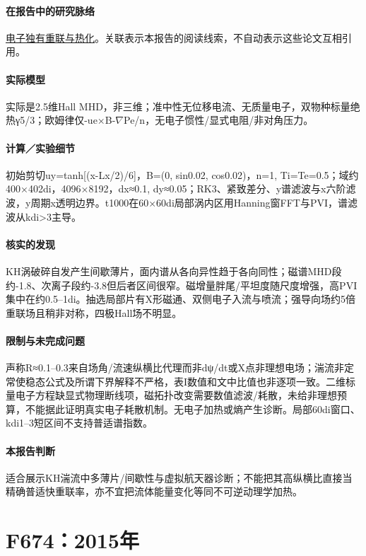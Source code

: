 \paragraph{在报告中的研究脉络}\hyperref[story:energy]{电子独有重联与热化}。关联表示本报告的阅读线索，不自动表示这些论文互相引用。

\paragraph{实际模型}实际是2.5维Hall MHD，非三维；准中性无位移电流、无质量电子，双物种标量绝热γ5/3；欧姆律仅-ue×B-\ensuremath{\nabla}Pe/n，无电子惯性/显式电阻/非对角压力。

\paragraph{计算／实验细节}初始剪切uy=tanh[(x-Lx/2)/6]，B=(0, sin0.02, cos0.02)，n=1, Ti=Te=0.5；域约400×402di，4096×8192，dx≈0.1, dy≈0.05；RK3、紧致差分、y谱滤波与x六阶滤波，y周期x透明边界。t1000在60×60di局部涡内区用Hanning窗FFT与PVI，谱滤波从kdi>3主导。

\paragraph{核实的发现}KH涡破碎自发产生间歇薄片，面内谱从各向异性趋于各向同性；磁谱MHD段约-1.8、次离子段约-3.8但后者区间很窄。磁增量胖尾/平坦度随尺度增强，高PVI集中在约0.5–1di。抽选局部片有X形磁通、双侧电子入流与喷流；强导向场约5倍重联场且稍非对称，四极Hall场不明显。

\paragraph{限制与未完成问题}声称R≈0.1–0.3来自场角/流速纵横比代理而非dψ/dt或X点非理想电场；湍流非定常使稳态公式及所谓下界解释不严格，表I数值和文中比值也非逐项一致。二维标量电子方程缺显式物理断线项，磁拓扑改变需要数值滤波/耗散，未给非理想预算，不能据此证明真实电子耗散机制。无电子加热或熵产生诊断。局部60di窗口、kdi1–3短区间不支持普适谱指数。

\paragraph{本报告判断}适合展示KH湍流中多薄片/间歇性与虚拟航天器诊断；不能把其高纵横比直接当精确普适快重联率，亦不宜把流体能量变化等同不可逆动理学加热。

\section{F674：2015年}\label{paper:F674}

